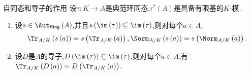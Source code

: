 \begin{remark}{自同态和导子的作用}{}
	设$\tau:K\to A$是典范环同态,$\tau^{\ast}\left(A\right)$是具备有限基的$K$-模.
	\begin{enumerate}
		\item 设$s\in\Aut_{\mathsf{Ring}}\left(A\right)$,并且$s\left(\im\left(\tau\right)\right)\subseteq\im\left(\tau\right)$,则对每个$a\in A$,
		\begin{align*}
			\Tr_{A/K}\left(s\left(a\right)\right)=s\left(\Tr_{A/K}\left(a\right)\right),\Norm_{A/K}\left(s\left(a\right)\right)=s\left(\Norm_{A/K}\left(a\right)\right).
		\end{align*}
		\item 设$D$是$A$的导子,$D\left(\im\left(\tau\right)\right)\subseteq\im\left(\tau\right)$,则对每个$a\in A$,有$\Tr_{A/K}\left(D\left(a\right)\right)=D\left(\Tr_{A/K}\left(a\right)\right)$.
	\end{enumerate}
\end{remark}











































































